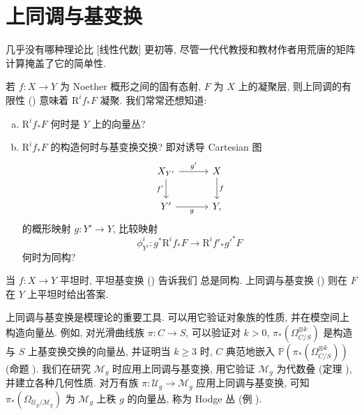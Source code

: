 \section{上同调与基变换}\label{src:A.6}
\begin{epigraph}
几乎没有哪种理论比 [线性代数] 更初等, 尽管一代代教授和教材作者用荒唐的矩阵计算掩盖了它的简单性.
\end{epigraph}
若 $f:X\to Y$ 为 Noether 概形之间的固有态射, $F$ 为 $X$ 上的凝聚层, 则上同调的有限性 () 意味着 $\mathrm R^i f_*F$ 凝聚. 我们常常还想知道:
\begin{enumerate}[(a)]
\item $\mathrm R^i f_*F$ 何时是 $Y$ 上的向量丛?
\item $\mathrm R^i f_*F$ 的构造何时与基变换交换? 即对诱导 Cartesian 图
\[
\begin{tikzcd}[column sep=3em,row sep=2em]
X_{Y'}\arrow[r,"g'"]\arrow[d,"f'"']&X\arrow[d,"f"]\\
Y'\arrow[r,"g"']&Y,
\end{tikzcd}
\]
的概形映射 $g:Y'\to Y$, 比较映射
\begin{equation}\label{src:A.6.1}
\phi_{Y'}^i:g^*\mathrm R^if_*F\longrightarrow\mathrm R^if'_*g'^*F
\end{equation}
何时为同构?
\end{enumerate}
当 $f:X\to Y$ 平坦时, 平坦基变换 () 告诉我们  总是同构. 上同调与基变换 () 则在 $F$ 在 $Y$ 上平坦时给出答案.

上同调与基变换是模理论的重要工具. 可以用它验证对象族的性质, 并在模空间上构造向量丛. 例如, 对光滑曲线族 $\pi:C\to S$, 可以验证对 $k>0$, $\pi_*(\Omega_{C/S}^{\otimes k})$ 是构造与 $S$ 上基变换交换的向量丛, 并证明当 $k\geq3$ 时, $C$ 典范地嵌入 $\mathbb P(\pi_*(\Omega_{C/S}^{\otimes k}))$ (命题 ). 我们在研究 $\mathcal M_g$ 时应用上同调与基变换, 用它验证 $\mathcal M_g$ 为代数叠 (定理 ), 并建立各种几何性质. 对万有族 $\pi:\mathcal U_g\to\mathcal M_g$ 应用上同调与基变换, 可知 $\pi_*(\Omega_{\mathcal U_g/\mathcal M_g})$ 为 $\mathcal M_g$ 上秩 $g$ 的向量丛, 称为 Hodge 丛 (例 ).

